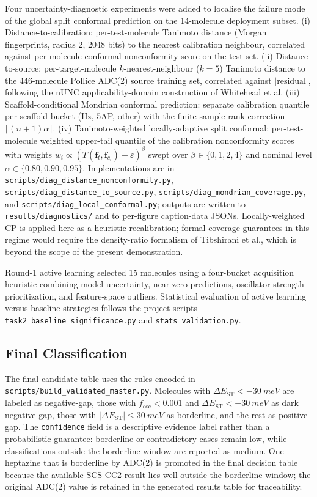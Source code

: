 \documentclass[journal=jcisd8,manuscript=article]{achemso}
\begin{document}
Four uncertainty-diagnostic experiments were added to localise the failure mode of the global split conformal prediction on the 14-molecule deployment subset. (i) Distance-to-calibration: per-test-molecule Tanimoto distance (Morgan fingerprints, radius 2, 2048 bits) to the nearest calibration neighbour, correlated against per-molecule conformal nonconformity score on the test set. (ii) Distance-to-source: per-target-molecule $k$-nearest-neighbour ($k=5$) Tanimoto distance to the 446-molecule Pollice ADC(2) source training set, correlated against $|\text{residual}|$, following the nUNC applicability-domain construction of Whitehead et al.\cite{Whitehead2026} (iii) Scaffold-conditional Mondrian conformal prediction\cite{Bostrom2020}: separate calibration quantile per scaffold bucket (Hz, 5AP, other) with the finite-sample rank correction $\lceil(n+1)\alpha\rceil$. (iv) Tanimoto-weighted locally-adaptive split conformal: per-test-molecule weighted upper-tail quantile of the calibration nonconformity scores with weights $w_i \propto (T(\mathbf{f}_t,\mathbf{f}_{c_i})+\varepsilon)^{\beta}$ swept over $\beta \in \{0,1,2,4\}$ and nominal level $\alpha \in \{0.80, 0.90, 0.95\}$. Implementations are in \texttt{scripts/diag\_distance\_nonconformity.py}, \texttt{scripts/diag\_distance\_to\_source.py}, \texttt{scripts/diag\_mondrian\_coverage.py}, and \texttt{scripts/diag\_local\_conformal.py}; outputs are written to \texttt{results/diagnostics/} and to per-figure caption-data JSONs. Locally-weighted CP is applied here as a heuristic recalibration; formal coverage guarantees in this regime would require the density-ratio formalism of Tibshirani et al.\cite{Tibshirani2019}, which is beyond the scope of the present demonstration.

Round-1 active learning selected 15 molecules using a four-bucket acquisition heuristic combining model uncertainty, near-zero predictions, oscillator-strength prioritization, and feature-space outliers. Statistical evaluation of active learning versus baseline strategies follows the project scripts \texttt{task2\_baseline\_significance.py} and \texttt{stats\_validation.py}.

\subsection{Final Classification}

The final candidate table uses the rules encoded in \texttt{scripts/build\_validated\_master.py}. Molecules with $\Delta E_\mathrm{ST}<-\SI{30}{meV}$ are labeled as negative-gap, those with $f_\mathrm{osc}<0.001$ and $\Delta E_\mathrm{ST}<-\SI{30}{meV}$ as dark negative-gap, those with $|\Delta E_\mathrm{ST}|\leq\SI{30}{meV}$ as borderline, and the rest as positive-gap. The \texttt{confidence} field is a descriptive evidence label rather than a probabilistic guarantee: borderline or contradictory cases remain low, while classifications outside the borderline window are reported as medium. One heptazine that is borderline by ADC(2) is promoted in the final decision table because the available SCS-CC2 result lies well outside the borderline window; the original ADC(2) value is retained in the generated results table for traceability.
\end{document}

